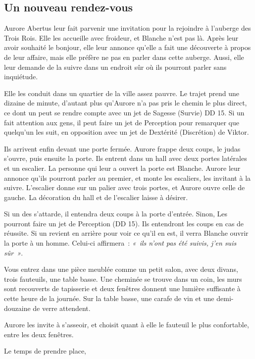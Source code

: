 \documentclass[a4paper,10pt,openany]{book}
\begin{document}
\begin{multicols}{2}
\subsection{Un nouveau rendez-vous}
Aurore Abertus leur fait parvenir une invitation pour la rejoindre à l’auberge des Trois Rois. Elle les accueille avec froideur, et Blanche n’est pas
là. Après leur avoir souhaité le bonjour, elle leur annonce qu’elle a fait une découverte à propos de leur affaire, mais elle préfère ne pas en parler
dans cette auberge. Aussi, elle leur demande de la suivre dans un endroit sûr où ils pourront parler sans inquiétude.\par Elle les conduit dans un
quartier de la ville assez pauvre. Le trajet prend une dizaine de minute, d’autant plus qu’Aurore n’a pas pris le chemin le plus direct, ce dont un
\PJ peut se rendre compte avec un jet de Sagesse (Survie) DD 15. Si un \PJ fait attention aux gens, il peut faire un jet de Perception pour remarquer
que quelqu’un les suit, en opposition avec un jet de Dextérité (Discrétion) de Viktor.\par Ils arrivent enfin devant une porte fermée. Aurore frappe
deux coups, le judas s’ouvre, puis ensuite la  porte. Ils entrent dans un hall avec deux portes latérales et un escalier. La personne qui leur a
ouvert la porte est Blanche. Aurore leur annonce qu’ils pourront parler au premier, et monte les escaliers, les invitant à la suivre. L’escalier donne
sur un palier avec trois portes, et Aurore ouvre celle de gauche. La décoration du hall et de l’escalier laisse à désirer.\par Si un des \PJs
s’attarde, il entendra deux coups à la porte d’entrée. Sinon, Les \PJs pourront faire un jet de Perception (DD 15). Ils entendront les coups en cas de
réussite. Si un \PJ revient en arrière pour voir ce qu’il en est, il verra Blanche ouvrir la porte à un homme. Celui-ci affirmera : \emph{« ils n’ont
pas été suivis, j’en suis sûr »}.
\begin{paperbox}{ }
	Vous entrez dans une pièce meublée comme un petit salon, avec deux divans, trois fauteuils, une table basse. Une cheminée se trouve dans un coin,
	les murs sont recouverts de tapisserie et deux fenêtres donnent une lumière suffisante à cette heure de la journée. Sur la table basse, une carafe de
	vin et une demi-douzaine de verre attendent. 
\end{paperbox}
Aurore les invite à s’asseoir, et choisit quant à elle le fauteuil le plus confortable, entre les deux fenêtres.\par Le temps de prendre place,

\end{multicols}
\end{document}
